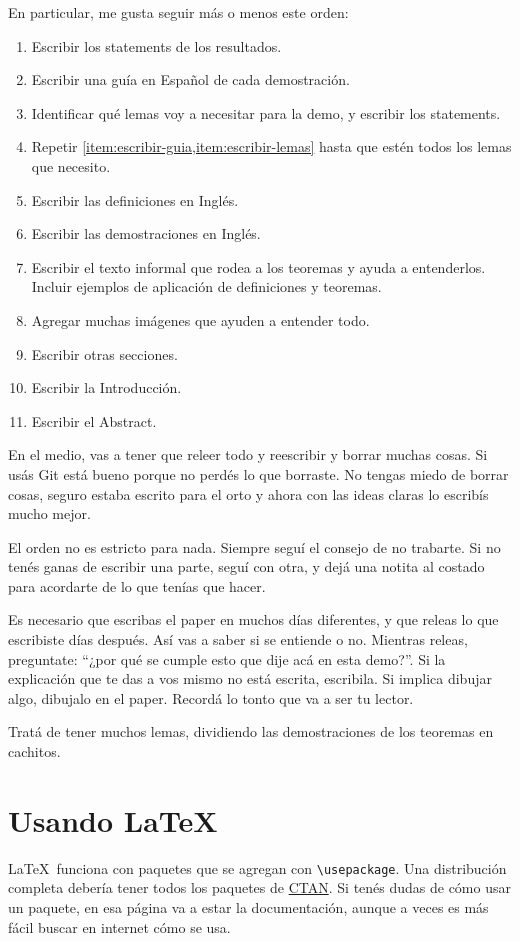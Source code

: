 \documentclass{article}
\begin{document}
En particular, me gusta seguir más o menos este orden:
\begin{enumerate}
\item Escribir los statements de los resultados.
\item\label{item:escribir-guia} Escribir una guía en Español de cada demostración.
\item\label{item:escribir-lemas} Identificar qué lemas voy a necesitar para la demo, y escribir los statements.
\item Repetir \cref{item:escribir-guia,item:escribir-lemas} hasta que estén todos los lemas que necesito.
\item Escribir las definiciones en Inglés.
\item Escribir las demostraciones en Inglés.
\item Escribir el texto informal que rodea a los teoremas y ayuda a entenderlos. Incluir ejemplos de aplicación de definiciones y teoremas.
\item Agregar muchas imágenes que ayuden a entender todo.
\item Escribir otras secciones.
\item Escribir la Introducción.
\item Escribir el Abstract.
\end{enumerate}

En el medio, vas a tener que releer todo y reescribir y borrar muchas cosas. Si usás Git está bueno porque no perdés lo que borraste. No tengas miedo de borrar cosas, seguro estaba escrito para el orto y ahora con las ideas claras lo escribís mucho mejor.

El orden no es estricto para nada. Siempre seguí el consejo de no trabarte. Si no tenés ganas de escribir una parte, seguí con otra, y dejá una notita al costado para acordarte de lo que tenías que hacer.

Es necesario que escribas el paper en muchos días diferentes, y que releas lo que escribiste días después. Así vas a saber si se entiende o no. Mientras releas, preguntate: ``¿por qué se cumple esto que dije acá en esta demo?''. Si la explicación que te das a vos mismo no está escrita, escribila. Si implica dibujar algo, dibujalo en el paper. Recordá lo tonto que va a ser tu lector.

Tratá de tener muchos lemas, dividiendo las demostraciones de los teoremas en cachitos.

\section{Usando \LaTeX}
\LaTeX\ funciona con paquetes que se agregan con \verb|\usepackage|. Una distribución completa debería tener todos los paquetes de \href{https://ctan.org/}{CTAN}. Si tenés dudas de cómo usar un paquete, en esa página va a estar la documentación, aunque a veces es más fácil buscar en internet cómo se usa.
\end{document}
